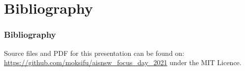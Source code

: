 \documentclass{beamer}
\begin{document}


\section{Bibliography}


\begin{frame}
  \frametitle{Bibliography}
  \printbibliography

  Source files and PDF for this presentation can be found on:
  \url{https://github.com/moksifu/aisnsw_focus_day_2021}
  under the MIT Licence.
\end{frame}


\end{document}
